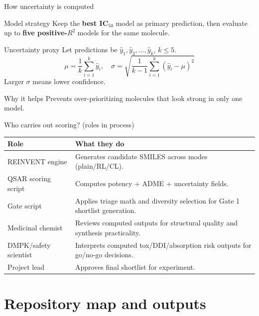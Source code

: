 \documentclass[aspectratio=169,10pt]{beamer}
\begin{document}
\begin{frame}{How uncertainty is computed}
  \begin{block}{Model strategy}
    Keep the \textbf{best IC\(_{50}\)} model as primary prediction,
    then evaluate up to \textbf{five positive-\(R^2\)} models for the same molecule.
  \end{block}

  \begin{block}{Uncertainty proxy}
    Let predictions be \(\hat{y}_1,\hat{y}_2,\dots,\hat{y}_k\), \(k\leq 5\).
    \[
      \mu = \frac{1}{k}\sum_{i=1}^k \hat{y}_i,
      \quad
      \sigma = \sqrt{\frac{1}{k-1}\sum_{i=1}^k(\hat{y}_i-\mu)^2}
    \]
    Larger \(\sigma\) means lower confidence.
  \end{block}

  \begin{exampleblock}{Why it helps}
    Prevents over-prioritizing molecules that look strong in only one model.
  \end{exampleblock}
\end{frame}

\begin{frame}{Who carries out scoring? (roles in process)}
  \begin{tabularx}{\textwidth}{lX}
    \toprule
    \textbf{Role} & \textbf{What they do} \\
    \midrule
    REINVENT engine & Generates candidate SMILES across modes (plain/RL/CL). \\
    QSAR scoring script & Computes potency + ADME + uncertainty fields. \\
    Gate script & Applies triage math and diversity selection for Gate 1 shortlist generation. \\
    Medicinal chemist & Reviews computed outputs for structural quality and synthesis practicality. \\
    DMPK/safety scientist & Interprets computed tox/DDI/absorption risk outputs for go/no-go decisions. \\
    Project lead & Approves final shortlist for experiment. \\
    \bottomrule
  \end{tabularx}
\end{frame}

\section{Repository map and outputs}
\end{document}
